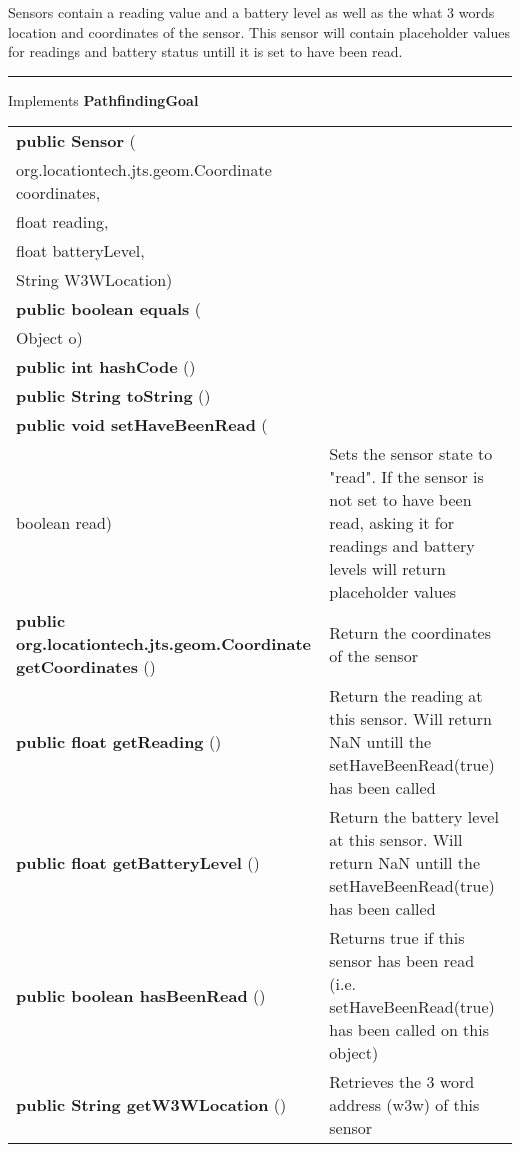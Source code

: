  { Sensors contain a reading value and a battery level as well as the what 3 words location and coordinates of the sensor.\newline%
 This sensor will contain placeholder values for readings and battery status untill it is set to have been read.
 
\vspace*{4pt} \hrule \vspace*{3pt}
Implements \textbf{ PathfindingGoal }
\begin{tabular}{ p{3in}|m{3.4in}}
\textbf{public Sensor } (\\ \hspace*{ 5pt} org.locationtech.jts.geom.Coordinate coordinates,\\\hspace*{ 5pt} float reading,\\\hspace*{ 5pt} float batteryLevel,\\\hspace*{ 5pt} String W3WLocation) & \\ \hline 
\textbf{public boolean equals } (\\ \hspace*{ 5pt} Object o) & \\ \hline 
\textbf{public int hashCode} () & \\ \hline 
\textbf{public String toString} () & \\ \hline 
\textbf{public void setHaveBeenRead } (\\ \hspace*{ 5pt} boolean read) & Sets the sensor state to "read". If the sensor is not set to have been read, asking it for readings and battery levels will return placeholder values\\ \hline 
\textbf{public org.locationtech.jts.geom.Coordinate getCoordinates} () & Return the coordinates of the sensor\\ \hline 
\textbf{public float getReading} () & Return the reading at this sensor. Will return NaN untill the setHaveBeenRead(true) has been called\\ \hline 
\textbf{public float getBatteryLevel} () & Return the battery level at this sensor. Will return NaN untill the setHaveBeenRead(true) has been called\\ \hline 
\textbf{public boolean hasBeenRead} () & Returns true if this sensor has been read (i.e. setHaveBeenRead(true) has been called on this object)\\ \hline 
\textbf{public String getW3WLocation} () & Retrieves the 3 word address (w3w) of this sensor\\ \hline 
\end{tabular}
}
